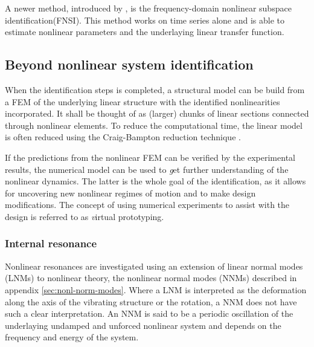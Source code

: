 A newer method, introduced by \textcite{noel2013a}, is the frequency-domain
nonlinear subspace identification(FNSI). This method works on
time series alone and is able to estimate nonlinear parameters and the
underlaying linear transfer function.






\subsection{Beyond nonlinear system identification}
\label{sec:beyond-nonl-syst}

When the identification steps is completed, a structural model can be build from
a FEM of the underlying linear structure with the identified nonlinearities
incorporated. It shall be thought of as (larger) chunks of linear sections
connected through nonlinear elements. To reduce the computational time, the
linear model is often reduced using the Craig-Bampton reduction technique
\autocite{craig1968a}.

If the predictions from the nonlinear FEM can be verified by the
experimental results, the numerical model can be used to {\textit get further
  understanding of the nonlinear dynamics}. The latter is the whole goal of the
identification, as it allows for uncovering new nonlinear regimes of motion and
to make design modifications. The concept of using numerical experiments to
assist with the design is referred to as {\textit virtual prototyping}.


\subsubsection{Internal resonance}
\label{sec:internal-resonance}


Nonlinear resonances are investigated using an extension of linear normal modes
(LNMs) to nonlinear theory, the nonlinear normal modes (NNMs) described in
appendix \ref{sec:nonl-norm-modes}.
Where a LNM is interpreted as the deformation along the axis of the vibrating
structure or the rotation, a NNM does not have such a clear interpretation.
An NNM is said to be a periodic oscillation of the underlaying undamped and
unforced nonlinear system and depends on the frequency and energy of the
system.


